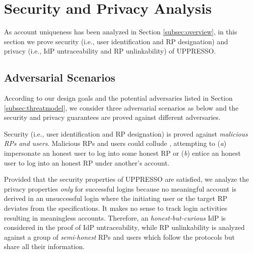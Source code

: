 \section{Security and Privacy Analysis}
\label{sec:analysis}

As account uniqueness has been analyzed in Section \ref{subsec:overview},
in this section we prove security (i.e., user identification and RP designation) and privacy (i.e., IdP untraceability and RP unlinkability) of UPPRESSO.


\subsection{Adversarial Scenarios}

According to our design goals %
 and the potential adversaries listed in Section \ref{subsec:threatmodel}, we consider three adversarial scenarios as below
 and the security and privacy guarantees are proved against different adversaries.


Security (i.e., user identification and RP designation) is proved against \emph{malicious RPs and users}.
 Malicious RPs and users could collude \cite{FettKS14,BrowserID,SPRESSO},
  attempting to (\emph{a}) impersonate an honest user to log into some honest RP
   or (\emph{b}) entice an honest user to log into an honest RP under another's account.

Provided that the security properties of UPPRESSO are satisfied,
    we analyze the privacy properties \emph{only} for successful logins
    because no meaningful account is derived in an unsuccessful login
where the initiating user or the target RP deviates from the specifications.
It makes no sense to track login activities resulting in meaningless accounts.
Therefore,
    an \emph{honest-but-curious} IdP is considered in the proof of IdP untraceability,
while RP unlinkability is analyzed against a group of \emph{semi-honest} RPs and users which follow the protocols but share all their information.

%


